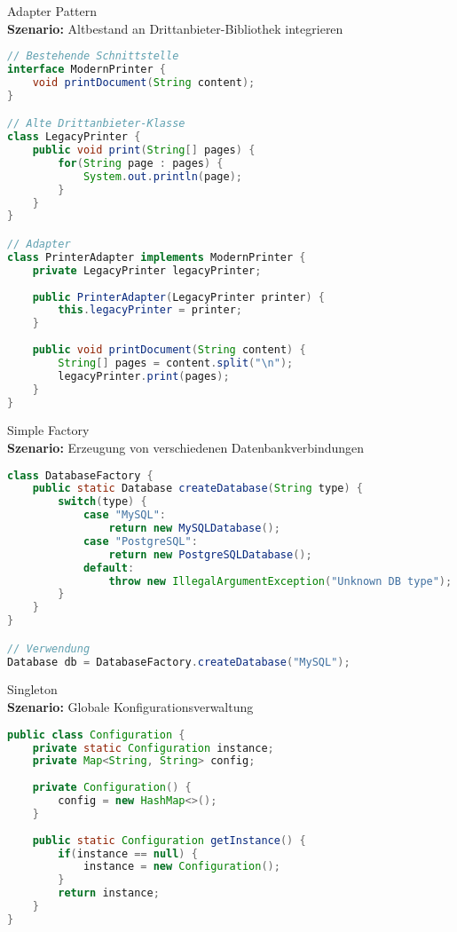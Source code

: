 \begin{example2}{Adapter Pattern}\\
\textbf{Szenario:} Altbestand an Drittanbieter-Bibliothek integrieren
\begin{lstlisting}[language=Java, style=base] 
// Bestehende Schnittstelle
interface ModernPrinter {
    void printDocument(String content);
}

// Alte Drittanbieter-Klasse
class LegacyPrinter {
    public void print(String[] pages) {
        for(String page : pages) {
            System.out.println(page);
        }
    }
}

// Adapter
class PrinterAdapter implements ModernPrinter {
    private LegacyPrinter legacyPrinter;
    
    public PrinterAdapter(LegacyPrinter printer) {
        this.legacyPrinter = printer;
    }
    
    public void printDocument(String content) {
        String[] pages = content.split("\n");
        legacyPrinter.print(pages);
    }
}
\end{lstlisting}
\end{example2}

\begin{example2}{Simple Factory}\\
\textbf{Szenario:} Erzeugung von verschiedenen Datenbankverbindungen
\begin{lstlisting}[language=Java, style=base]
class DatabaseFactory {
    public static Database createDatabase(String type) {
        switch(type) {
            case "MySQL":
                return new MySQLDatabase();
            case "PostgreSQL":
                return new PostgreSQLDatabase();
            default:
                throw new IllegalArgumentException("Unknown DB type");
        }
    }
}

// Verwendung
Database db = DatabaseFactory.createDatabase("MySQL");
\end{lstlisting}
\end{example2}

\begin{example2}{Singleton}\\
\textbf{Szenario:} Globale Konfigurationsverwaltung
\begin{lstlisting}[language=Java, style=base]
public class Configuration {
    private static Configuration instance;
    private Map<String, String> config;
    
    private Configuration() {
        config = new HashMap<>();
    }
    
    public static Configuration getInstance() {
        if(instance == null) {
            instance = new Configuration();
        }
        return instance;
    }
}
\end{lstlisting}
\end{example2}

